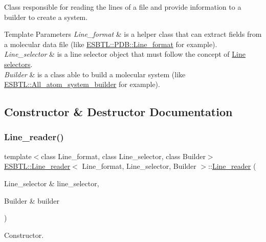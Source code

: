 Class responsible for reading the lines of a file and provide information to a builder to create a system. 
\begin{DoxyTemplParams}{Template Parameters}
{\em Line\+\_\+format} & is a helper class that can extract fields from a molecular data file (like \hyperlink{classESBTL_1_1PDB_1_1Line__format}{E\+S\+B\+T\+L\+::\+P\+D\+B\+::\+Line\+\_\+format} for example). \\
\hline
{\em Line\+\_\+selector} & is a line selector object that must follow the concept of \hyperlink{group__linesel}{Line selectors}. \\
\hline
{\em Builder} & is a class able to build a molecular system (like \hyperlink{classESBTL_1_1All__atom__system__builder}{E\+S\+B\+T\+L\+::\+All\+\_\+atom\+\_\+system\+\_\+builder} for example). \\
\hline
\end{DoxyTemplParams}


\subsection{Constructor \& Destructor Documentation}
\mbox{\label{classESBTL_1_1Line__reader_a1bf419275695ceff1bd89bae72013f9e}} 
\subsubsection{\texorpdfstring{Line\+\_\+reader()}{Line\_reader()}}
{\footnotesize\ttfamily template$<$class Line\+\_\+format, class Line\+\_\+selector, class Builder$>$ \\
\hyperlink{classESBTL_1_1Line__reader}{E\+S\+B\+T\+L\+::\+Line\+\_\+reader}$<$ Line\+\_\+format, Line\+\_\+selector, Builder $>$\+::\hyperlink{classESBTL_1_1Line__reader}{Line\+\_\+reader} (\begin{DoxyParamCaption}\item[{Line\+\_\+selector \&}]{line\+\_\+selector,  }\item[{Builder \&}]{builder }\end{DoxyParamCaption})\hspace{0.3cm}{\ttfamily [inline]}}

Constructor. 

